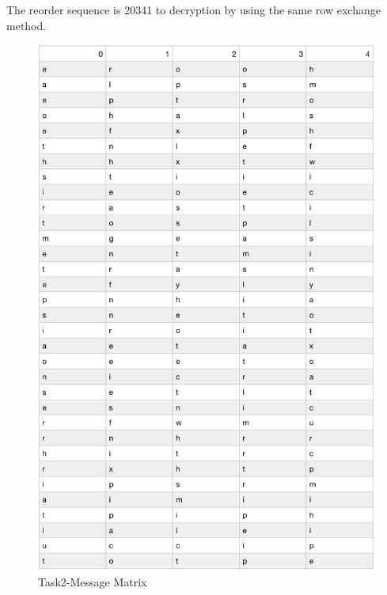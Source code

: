 \documentclass[twoside,twocolumn]{article}
\begin{document}
The reorder sequence is 20341 to decryption by using the same row exchange method.\\

\begin{figure}[H]
  \centering
  \includegraphics[scale=0.4]{./Graphs/Figure1.7.png}
  \caption{Task2-Message Matrix}
  \label{fig:testfig1}
\end{figure}
\end{document}
